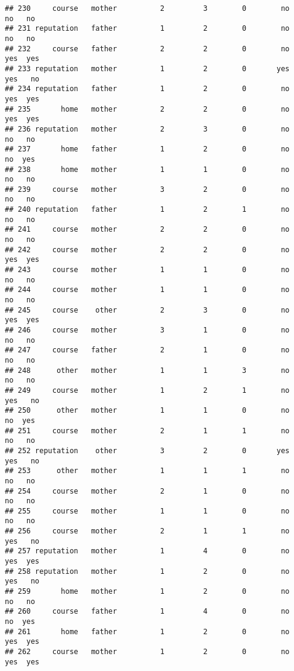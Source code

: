 \documentclass[
]{article}
\begin{document}
\begin{verbatim}
## 230     course   mother          2         3        0        no     no   no
## 231 reputation   father          1         2        0        no     no   no
## 232     course   father          2         2        0        no    yes  yes
## 233 reputation   mother          1         2        0       yes    yes   no
## 234 reputation   father          1         2        0        no    yes  yes
## 235       home   mother          2         2        0        no    yes  yes
## 236 reputation   mother          2         3        0        no     no   no
## 237       home   father          1         2        0        no     no  yes
## 238       home   mother          1         1        0        no     no   no
## 239     course   mother          3         2        0        no     no   no
## 240 reputation   father          1         2        1        no     no   no
## 241     course   mother          2         2        0        no     no   no
## 242     course   mother          2         2        0        no    yes  yes
## 243     course   mother          1         1        0        no     no   no
## 244     course   mother          1         1        0        no     no   no
## 245     course    other          2         3        0        no    yes  yes
## 246     course   mother          3         1        0        no     no   no
## 247     course   father          2         1        0        no     no   no
## 248      other   mother          1         1        3        no     no   no
## 249     course   mother          1         2        1        no    yes   no
## 250      other   mother          1         1        0        no     no  yes
## 251     course   mother          2         1        1        no     no   no
## 252 reputation    other          3         2        0       yes    yes   no
## 253      other   mother          1         1        1        no     no   no
## 254     course   mother          2         1        0        no     no   no
## 255     course   mother          1         1        0        no     no   no
## 256     course   mother          2         1        1        no    yes   no
## 257 reputation   mother          1         4        0        no    yes  yes
## 258 reputation   mother          1         2        0        no    yes   no
## 259       home   mother          1         2        0        no     no   no
## 260     course   father          1         4        0        no     no  yes
## 261       home   father          1         2        0        no    yes  yes
## 262     course   mother          1         2        0        no    yes  yes

\end{verbatim}
\end{document}
